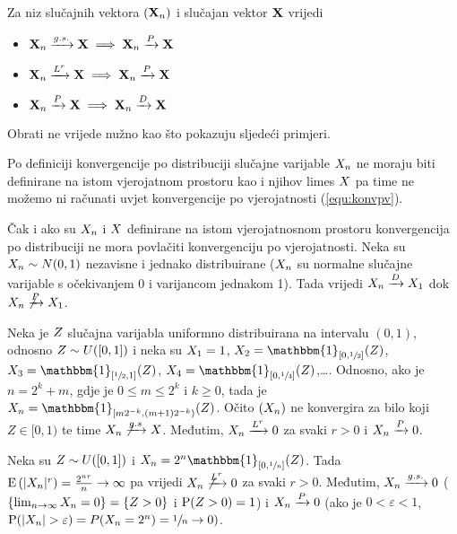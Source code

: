 \begin{tm} \label{tm:vezemedjukonvergencijama}
	Za niz slučajnih vektora $(\tsvek{X}_n)$ i slučajan vektor $\tsvek{X}$ vrijedi
	\begin{itemize}
		\item[(i)]{ $\konvgs{\tsvek{X}_n}{\tsvek{X}} 
			\implies \konvpv{\tsvek{X}_n}{\tsvek{X}}$ }
		\item[(ii)]{ $\konvusr{\tsvek{X}_n}{\tsvek{X}}{r}
			\implies \konvpv{\tsvek{X}_n}{\tsvek{X}}$ }
		\item[(iii)]{ $\konvpv{\tsvek{X}_n}{\tsvek{X}} 
			\implies \konvpd{\tsvek{X}_n}{\tsvek{X}}$ }
	\end{itemize}
\end{tm}

Obrati ne vrijede nužno kao što pokazuju sljedeći primjeri.

\begin{primjer_}
	Po definiciji konvergencije po distribuciji slučajne varijable $\tsvar{X}_n$
	ne moraju biti definirane na istom vjerojatnom prostoru
	kao i njihov limes $\tsvar{X}$ pa time ne možemo ni računati
	uvjet konvergencije po vjerojatnosti (\ref{equ:konvpv}).

	Čak i ako su $\tsvar{X}_n$ i $\tsvar{X}$ definirane na istom vjerojatnosnom prostoru
	konvergencija po distribuciji ne mora povlačiti konvergenciju po
	vjerojatnosti. Neka su $\tsvar{X}_n \sim N(0,1)$  nezavisne i jednako distribuirane
	($\tsvar{X}_n$ su normalne slučajne varijable s očekivanjem 0 i varijancom jednakom 1).
	Tada vrijedi $\konvpd{\tsvar{X}_n}{\tsvar{X}_1}$ dok
	$\nkonvpv{\tsvar{X}_n}{\tsvar{X}_1}$.
\end{primjer_}

\begin{primjer_}
	Neka je $\tsvar{Z}$ slučajna varijabla uniformno distribuirana na intervalu $(0,1)$,
	odnosno $\tsvar{Z} \sim U([0,1])$ i neka su 
	$\tsvar{X}_1=1$,
	$\tsvar{X}_2 = \mathbbm{1}_{[0,\sfrac{1}{2}]}(\tsvar{Z})$,
	$\tsvar{X}_3 = \mathbbm{1}_{[\sfrac{1}{2},1]}(\tsvar{Z})$,
	$\tsvar{X}_4 = \mathbbm{1}_{[0,\sfrac{1}{4}]}(\tsvar{Z})$,\ldots.
	Odnosno, ako je $n=2^k + m$, gdje je $0 \leq m \leq 2^k$ i $k \geq 0$, tada
	je $\tsvar{X}_n = \mathbbm{1}_{[m 2^{-k}, (m+1) 2^{-k})}(Z)$.
	Očito $(\tsvar{X}_n)$ ne
	konvergira za bilo koji $Z \in [0,1)$ te time 
	$\nkonvgs{\tsvar{X}_n}{\tsvar{X}}$.
	Međutim, $\konvusr{\tsvar{X}_n}{0}{r}$ za svaki $r>0$ i $\konvpv{\tsvar{X}_n}{0}$.
\end{primjer_}

\begin{primjer_}
	Neka su $\tsvar{Z} \sim U([0,1])$ i $\tsvar{X}_n = 2^n \mathbbm{1}_{[0,\sfrac{1}{n}]}(\tsvar{Z})$.
	Tada $\vE{ |\tsvar{X}_n|^r } = \frac{2^{nr}}{n} \rightarrow \infty$ pa vrijedi
	$\nkonvusr{\tsvar{X}_n}{0}{r}$ za svaki $r>0$. Međutim, $\konvgs{\tsvar{X}_n}{0}$
	($\{ \lim_{n\rightarrow \infty} \tsvar{X}_n = 0\} = \{\tsvar{Z} >0 \}$ i
	$\vP(\tsvar{Z}>0) = 1$) i $\konvpv{\tsvar{X}_n}{0}$
	(ako je $0 < \varepsilon < 1$, $\vP(|\tsvar{X}_n| > \varepsilon) =
	P(\tsvar{X}_n = 2^n) = \sfrac{1}{n} \rightarrow 0)$.
\end{primjer_}

